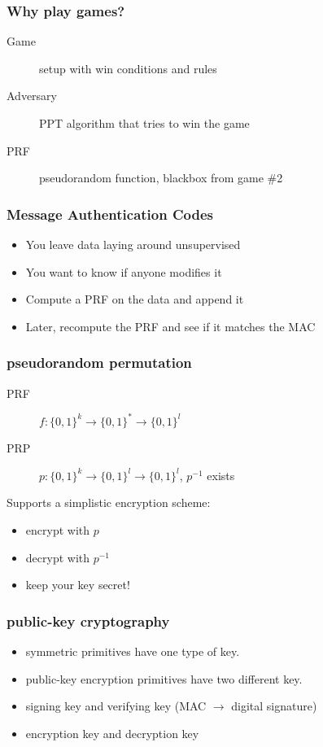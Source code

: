 \documentclass[serif,aspectratio=169]{beamer}
\begin{document}
\begin{frame}
	\frametitle{Why play games?}

	\begin{description}
		\item[Game] setup with win conditions and rules
		\item[Adversary] PPT algorithm that tries to win the game
		\item[PRF] pseudorandom function, blackbox from game \#2
	\end{description}
\end{frame}
\begin{frame}
	\frametitle{Message Authentication Codes}
	\begin{itemize}
		\item You leave data laying around unsupervised
		\item You want to know if anyone modifies it
		\item Compute a PRF on the data and append it
		\item Later, recompute the PRF and see if it matches the MAC
	\end{itemize}
\end{frame}
\begin{frame}
	\frametitle{pseudorandom permutation}
	\begin{description}
		\item[PRF] $f: {\{0,1\}}^k \rightarrow {\{0,1\}}^* \rightarrow {\{0,1\}}^l$
		\item[PRP] $p:  {\{0,1\}}^k \rightarrow {\{0,1\}}^l \rightarrow {\{0,1\}}^l$, $p^{-1}$ exists
	\end{description}
	Supports a simplistic encryption scheme: 
	\begin{itemize}
		\item encrypt with $p$
		\item decrypt with $p^{-1}$
		\item keep your key secret!
	\end{itemize}
\end{frame}
\begin{frame}
	\frametitle{public-key cryptography}
	\begin{itemize}
		\item symmetric primitives have one type of key.
		\item public-key encryption primitives have two different key.
		\item signing key and verifying key (MAC $\rightarrow$ digital signature)
		\item encryption key and decryption key
	\end{itemize}
\end{frame}
\end{document}

